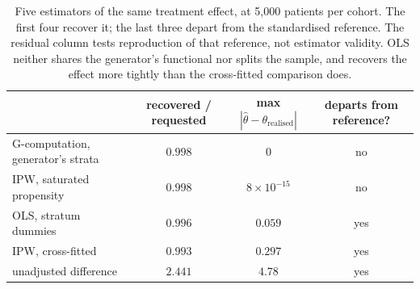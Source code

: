 \begin{table}[htbp]
\small
\centering
\caption{Five estimators of the same treatment effect, at 5{,}000 patients per
cohort. The first four recover it; the last three depart from the standardised
reference. The residual column tests reproduction of that reference, not
estimator validity. OLS neither shares the generator's functional
nor splits the sample, and recovers the effect more tightly than the cross-fitted
comparison does.}
\label{tab:trial}
\begin{tabular}{@{}lccc@{}}
\toprule
& \textbf{recovered / requested} & \textbf{max $|\hat\theta - \theta_{\text{realised}}|$}
& \textbf{departs from reference?} \\
\midrule
G-computation, generator's strata & $0.998$ & $0$          & no \\
IPW, saturated propensity         & $0.998$ & $8\times10^{-15}$ & no \\
OLS, stratum dummies              & $0.996$ & $0.059$      & yes \\
IPW, cross-fitted                 & $0.993$ & $0.297$      & yes \\
unadjusted difference             & $2.441$ & $4.78$       & yes \\
\bottomrule
\end{tabular}
\end{table}
